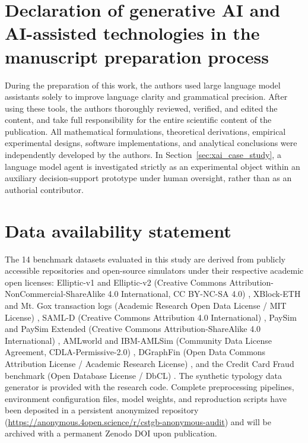 \documentclass[a4paper,fleqn]{cas-dc}
\begin{document}
\section*{Declaration of generative AI and AI-assisted technologies in the manuscript preparation process}
During the preparation of this work, the authors used large language model assistants solely to improve language clarity and grammatical precision. After using these tools, the authors thoroughly reviewed, verified, and edited the content, and take full responsibility for the entire scientific content of the publication. All mathematical formulations, theoretical derivations, empirical experimental designs, software implementations, and analytical conclusions were independently developed by the authors. In Section~\ref{sec:xai_case_study}, a language model agent is investigated strictly as an experimental object within an auxiliary decision-support prototype under human oversight, rather than as an authorial contributor.

\section*{Data availability statement}
The 14 benchmark datasets evaluated in this study are derived from publicly accessible repositories and open-source simulators under their respective academic open licenses: Elliptic-v1 and Elliptic-v2 (Creative Commons Attribution-NonCommercial-ShareAlike 4.0 International, CC BY-NC-SA 4.0) \citep{weber2019anti, bellei2024elliptic2}, XBlock-ETH and Mt. Gox transaction logs (Academic Research Open Data License / MIT License) \citep{zheng2020xblock}, SAML-D (Creative Commons Attribution 4.0 International) \citep{oztas2023samld}, PaySim and PaySim Extended (Creative Commons Attribution-ShareAlike 4.0 International) \citep{lopez2016paysim}, AMLworld and IBM-AMLSim (Community Data License Agreement, CDLA-Permissive-2.0) \citep{altman2023amlworld}, DGraphFin (Open Data Commons Attribution License / Academic Research License) \citep{dgraphfin}, and the Credit Card Fraud benchmark (Open Database License / DbCL) \citep{dalpozzolo2018credit}. The synthetic typology data generator is provided with the research code. Complete preprocessing pipelines, environment configuration files, model weights, and reproduction scripts have been deposited in a persistent anonymized repository (\url{https://anonymous.4open.science/r/cstgb-anonymous-audit}) and will be archived with a permanent Zenodo DOI upon publication.


\setlength{\bibsep}{1.2pt}

\end{document}
